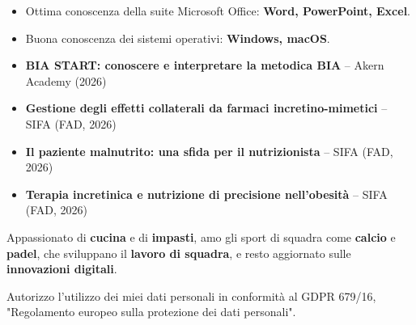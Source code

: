 





\begin{itemize}
    \item Ottima conoscenza della suite Microsoft Office: \textbf{Word, PowerPoint, Excel}.
    \item Buona conoscenza dei sistemi operativi: \textbf{Windows, macOS}.

\end{itemize}

\begin{itemize}
    \item \textbf{BIA START: conoscere e interpretare la metodica BIA} -- Akern Academy (2026)
    \item \textbf{Gestione degli effetti collaterali da farmaci incretino-mimetici} -- SIFA (FAD, 2026)
    \item \textbf{Il paziente malnutrito: una sfida per il nutrizionista} -- SIFA (FAD, 2026)
    \item \textbf{Terapia incretinica e nutrizione di precisione nell'obesità} -- SIFA (FAD, 2026)
\end{itemize}



Appassionato di \textbf{cucina} e di \textbf{impasti}, amo gli sport di squadra come \textbf{calcio} e \textbf{padel}, che sviluppano il \textbf{lavoro di squadra}, e resto aggiornato sulle \textbf{innovazioni digitali}.

\divider

\footnotesize{Autorizzo l'utilizzo dei miei dati personali in conformità al GDPR 679/16, "Regolamento europeo sulla protezione dei dati personali".}